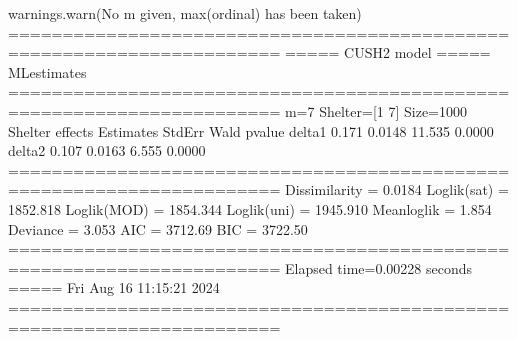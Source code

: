 \documentclass[letterpaper,10pt,english]{sphinxmanual}
\begin{document}
\begin{sphinxVerbatim}[commandchars=\\\{\}]
warnings.warn(\PYGZdq{}No m given, max(ordinal) has been taken\PYGZdq{})
=======================================================================
=====\PYGZgt{}\PYGZgt{}\PYGZgt{} CUSH2 model \PYGZlt{}\PYGZlt{}\PYGZlt{}===== ML\PYGZhy{}estimates
=======================================================================
m=7  Shelter=[1 7]  Size=1000
\PYGZhy{}\PYGZhy{}\PYGZhy{}\PYGZhy{}\PYGZhy{}\PYGZhy{}\PYGZhy{}\PYGZhy{}\PYGZhy{}\PYGZhy{}\PYGZhy{}\PYGZhy{}\PYGZhy{}\PYGZhy{}\PYGZhy{}\PYGZhy{}\PYGZhy{}\PYGZhy{}\PYGZhy{}\PYGZhy{}\PYGZhy{}\PYGZhy{}\PYGZhy{}\PYGZhy{}\PYGZhy{}\PYGZhy{}\PYGZhy{}\PYGZhy{}\PYGZhy{}\PYGZhy{}\PYGZhy{}\PYGZhy{}\PYGZhy{}\PYGZhy{}\PYGZhy{}\PYGZhy{}\PYGZhy{}\PYGZhy{}\PYGZhy{}\PYGZhy{}\PYGZhy{}\PYGZhy{}\PYGZhy{}\PYGZhy{}\PYGZhy{}\PYGZhy{}\PYGZhy{}\PYGZhy{}\PYGZhy{}\PYGZhy{}\PYGZhy{}\PYGZhy{}\PYGZhy{}\PYGZhy{}\PYGZhy{}\PYGZhy{}\PYGZhy{}\PYGZhy{}\PYGZhy{}\PYGZhy{}\PYGZhy{}\PYGZhy{}\PYGZhy{}\PYGZhy{}\PYGZhy{}\PYGZhy{}\PYGZhy{}\PYGZhy{}\PYGZhy{}\PYGZhy{}\PYGZhy{}
Shelter effects
        Estimates  StdErr    Wald  p\PYGZhy{}value
delta1      0.171  0.0148  11.535   0.0000
delta2      0.107  0.0163   6.555   0.0000
=======================================================================
Dissimilarity = 0.0184
Loglik(sat)   = \PYGZhy{}1852.818
Loglik(MOD)   = \PYGZhy{}1854.344
Loglik(uni)   = \PYGZhy{}1945.910
Mean\PYGZhy{}loglik   = \PYGZhy{}1.854
Deviance      = 3.053
\PYGZhy{}\PYGZhy{}\PYGZhy{}\PYGZhy{}\PYGZhy{}\PYGZhy{}\PYGZhy{}\PYGZhy{}\PYGZhy{}\PYGZhy{}\PYGZhy{}\PYGZhy{}\PYGZhy{}\PYGZhy{}\PYGZhy{}\PYGZhy{}\PYGZhy{}\PYGZhy{}\PYGZhy{}\PYGZhy{}\PYGZhy{}\PYGZhy{}\PYGZhy{}\PYGZhy{}\PYGZhy{}\PYGZhy{}\PYGZhy{}\PYGZhy{}\PYGZhy{}\PYGZhy{}\PYGZhy{}\PYGZhy{}\PYGZhy{}\PYGZhy{}\PYGZhy{}\PYGZhy{}\PYGZhy{}\PYGZhy{}\PYGZhy{}\PYGZhy{}\PYGZhy{}\PYGZhy{}\PYGZhy{}\PYGZhy{}\PYGZhy{}\PYGZhy{}\PYGZhy{}\PYGZhy{}\PYGZhy{}\PYGZhy{}\PYGZhy{}\PYGZhy{}\PYGZhy{}\PYGZhy{}\PYGZhy{}\PYGZhy{}\PYGZhy{}\PYGZhy{}\PYGZhy{}\PYGZhy{}\PYGZhy{}\PYGZhy{}\PYGZhy{}\PYGZhy{}\PYGZhy{}\PYGZhy{}\PYGZhy{}\PYGZhy{}\PYGZhy{}\PYGZhy{}\PYGZhy{}
AIC = 3712.69
BIC = 3722.50
=======================================================================
Elapsed time=0.00228 seconds =====\PYGZgt{}\PYGZgt{}\PYGZgt{} Fri Aug 16 11:15:21 2024
=======================================================================
\end{sphinxVerbatim}

\noindent{}
\end{document}
